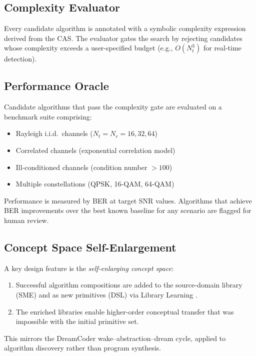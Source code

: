 \documentclass[12pt,a4paper]{article}
\begin{document}
\subsection{Complexity Evaluator}

Every candidate algorithm is annotated with a symbolic complexity expression
derived from the CAS.  The evaluator gates the search by rejecting candidates
whose complexity exceeds a user-specified budget (e.g., $O(N_t^3)$ for
real-time detection).

\subsection{Performance Oracle}

Candidate algorithms that pass the complexity gate are evaluated on a benchmark
suite comprising:
\begin{itemize}[itemsep=0pt]
  \item Rayleigh i.i.d.\ channels ($N_t = N_r = 16, 32, 64$)
  \item Correlated channels (exponential correlation model)
  \item Ill-conditioned channels (condition number $> 100$)
  \item Multiple constellations (QPSK, 16-QAM, 64-QAM)
\end{itemize}
Performance is measured by BER at target SNR values.  Algorithms that achieve
BER improvements over the best known baseline for any scenario are flagged
for human review.

\subsection{Concept Space Self-Enlargement}

A key design feature is the \emph{self-enlarging concept space}:
\begin{enumerate}[itemsep=0pt]
  \item Successful algorithm compositions are added to the source-domain
        library (SME) and as new primitives (DSL) via Library
        Learning \cite{dreamcoder2021}.
  \item The enriched libraries enable higher-order conceptual transfer that
        was impossible with the initial primitive set.
\end{enumerate}
This mirrors the DreamCoder wake--abstraction--dream cycle, applied to
algorithm discovery rather than program synthesis.

\end{document}
